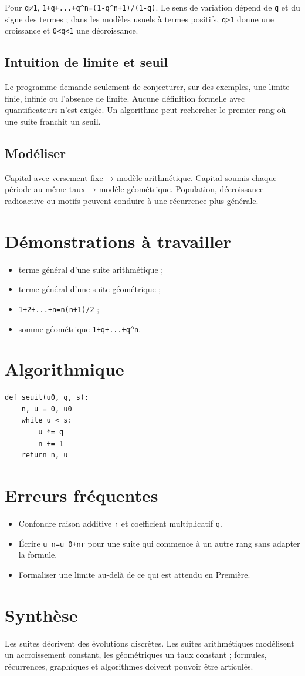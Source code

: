 Pour \texttt{q≠1}, \texttt{1+q+...+q^n=(1-q^{n+1})/(1-q)}. Le sens de variation dépend de \texttt{q} et du signe des termes ; dans les modèles usuels à termes positifs, \texttt{q>1} donne une croissance et \texttt{0<q<1} une décroissance.

\subsection{Intuition de limite et seuil}
Le programme demande seulement de conjecturer, sur des exemples, une limite finie, infinie ou l'absence de limite. Aucune définition formelle avec quantificateurs n'est exigée. Un algorithme peut rechercher le premier rang où une suite franchit un seuil.

\subsection{Modéliser}
Capital avec versement fixe → modèle arithmétique. Capital soumis chaque période au même taux → modèle géométrique. Population, décroissance radioactive ou motifs peuvent conduire à une récurrence plus générale.

\section{Démonstrations à travailler}
\begin{itemize}
\item terme général d'une suite arithmétique ;
\item terme général d'une suite géométrique ;
\item \texttt{1+2+...+n=n(n+1)/2} ;
\item somme géométrique \texttt{1+q+...+q^n}.
\end{itemize}

\section{Algorithmique}
\begin{verbatim}
def seuil(u0, q, s):
    n, u = 0, u0
    while u < s:
        u *= q
        n += 1
    return n, u
\end{verbatim}

\section{Erreurs fréquentes}
\begin{itemize}
\item Confondre raison additive \texttt{r} et coefficient multiplicatif \texttt{q}.
\item Écrire \texttt{u_n=u_0+nr} pour une suite qui commence à un autre rang sans adapter la formule.
\item Formaliser une limite au-delà de ce qui est attendu en Première.
\end{itemize}

\section{Synthèse}
Les suites décrivent des évolutions discrètes. Les suites arithmétiques modélisent un accroissement constant, les géométriques un taux constant ; formules, récurrences, graphiques et algorithmes doivent pouvoir être articulés.
